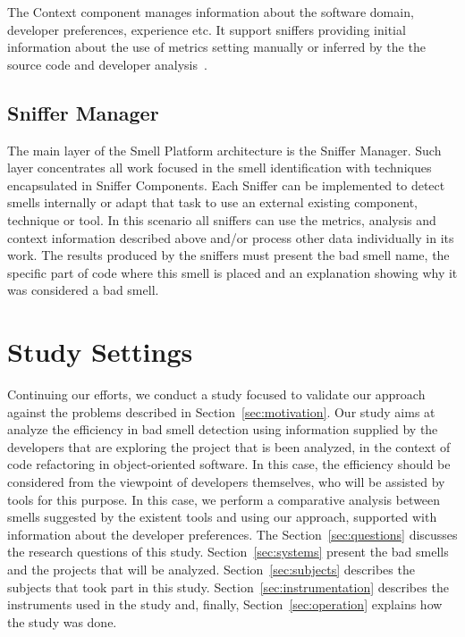 \documentclass[conference]{IEEEtran}
\begin{document}
The Context component manages information about the software domain, developer preferences, experience etc. It support sniffers providing initial information about the use of metrics setting manually or inferred by the the source code and developer analysis~\cite{Paloma:2014}. 

\subsection{Sniffer Manager}

The main layer of the Smell Platform architecture is the Sniffer Manager. Such layer concentrates all work focused in the smell identification with techniques encapsulated in Sniffer Components. Each Sniffer can be implemented to detect smells internally or adapt that task to use an external existing component, technique or tool. In this scenario all sniffers can use the metrics, analysis and context information described above and/or process other data individually in its work. The results produced by the sniffers must present the bad smell name, the specific part of code where this smell is placed and an explanation showing why it was considered a bad smell.

\section{Study Settings}
\label{sec:study}

Continuing our efforts, we conduct a study focused to validate our approach against the problems described in Section~\ref{sec:motivation}. Our study aims at analyze the efficiency in bad smell detection using information supplied by the developers that are exploring the project that is been analyzed, in the context of code refactoring in object-oriented software. In this case, the efficiency should be considered from the viewpoint of developers themselves, who will be assisted by tools for this purpose. In this case, we perform a comparative analysis between smells suggested by the existent tools and using our approach, supported with information about the developer preferences. The Section~\ref{sec:questions} discusses the research questions of this study. Section~\ref{sec:systems} present the bad smells and the projects that will be analyzed. Section~\ref{sec:subjects} describes the subjects that took part in this study. Section~\ref{sec:instrumentation} describes the instruments used in the study and, finally, Section~\ref{sec:operation} explains how the study was done.
\end{document}
